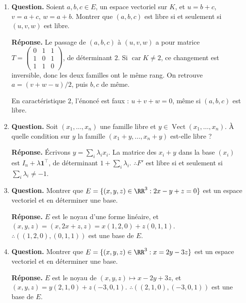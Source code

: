 \documentclass[12pt, a4paper]{article}
\begin{document}
\begin{enumerate}[label=6.\arabic*., start=105]
  \item \begin{minipage}[t]{\linewidth}\raggedright
\textbf{Question.} Soient $a,b,c\in E$, un espace vectoriel sur $K$, et $u=b+c$, $v=a+c$, $w=a+b$. Montrer que $(a,b,c)$ est libre si et seulement si $(u,v,w)$ est libre.
\par\smallskip
\textbf{Réponse.} Le passage de $(a,b,c)$ à $(u,v,w)$ a pour matrice
    $\displaystyle T=\begin{pmatrix}0&1&1\\1&0&1\\1&1&0\end{pmatrix}$, de déterminant $2$.
    Si $\operatorname{car}K\neq2$, ce changement est inversible, donc les deux familles ont le même rang.
    On retrouve $a=(v+w-u)/2$, puis $b,c$ de même.

    En caractéristique $2$, l'énoncé est faux : $u+v+w=0$, même si $(a,b,c)$ est libre.
\end{minipage}

  \item \begin{minipage}[t]{\linewidth}\raggedright
\textbf{Question.} Soit $(x_1,\ldots,x_n)$ une famille libre et $y\in\operatorname{Vect}(x_1,\ldots,x_n)$. À quelle condition sur $y$ la famille $(x_1+y,\ldots,x_n+y)$ est-elle libre ?
\par\smallskip
\textbf{Réponse.} Écrivons $y=\sum_i\lambda_ix_i$. La matrice des $x_i+y$ dans la base $(x_i)$ est
    $I_n+\lambda\boldsymbol{1}^\top$, de déterminant $1+\sum_i\lambda_i$.
    $\therefore F'$ est libre si et seulement si $\sum_i\lambda_i\neq-1$.
\end{minipage}

  \item \begin{minipage}[t]{\linewidth}\raggedright
\textbf{Question.} Montrer que $E=\{(x,y,z)\in\RR^3:2x-y+z=0\}$ est un espace vectoriel et en déterminer une base.
\par\smallskip
\textbf{Réponse.} $E$ est le noyau d'une forme linéaire, et
    $(x,y,z)=(x,2x+z,z)=x(1,2,0)+z(0,1,1)$.
    $\therefore ((1,2,0),(0,1,1))$ est une base de $E$.
\end{minipage}

  \item \begin{minipage}[t]{\linewidth}\raggedright
\textbf{Question.} Montrer que $E=\{(x,y,z)\in\RR^3:x=2y-3z\}$ est un espace vectoriel et en déterminer une base.
\par\smallskip
\textbf{Réponse.} $E$ est le noyau de $(x,y,z)\mapsto x-2y+3z$, et
    $(x,y,z)=y(2,1,0)+z(-3,0,1)$.
    $\therefore ((2,1,0),(-3,0,1))$ est une base de $E$.
\end{minipage}


\end{enumerate}
\end{document}
